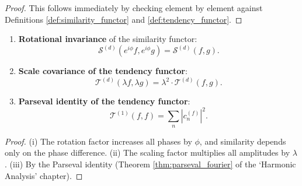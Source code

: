 \begin{proof}
This follows immediately by checking element by element against Definitions \ref{def:similarity_functor} and \ref{def:tendency_functor}.
\end{proof}

\begin{proposition}
\label{prop:similarity_tendency_conservation}
\leavevmode
\begin{enumerate}[label=(\roman*)]
    \item \textbf{Rotational invariance} of the similarity functor:
    \[
    \mathcal{S}^{(d)}(e^{i\phi} f, e^{i\phi} g)
    = \mathcal{S}^{(d)}(f, g).
    \]

    \item \textbf{Scale covariance of the tendency functor}:
    \[
    \mathcal{T}^{(d)}(\lambda f, \lambda g)
    = \lambda^2 \cdot \mathcal{T}^{(d)}(f, g).
    \]

    \item \textbf{Parseval identity of the tendency functor}:
    \[
    \mathcal{T}^{(1)}(f, f) = \sum_n |c_n^{(f)}|^2.
    \]
\end{enumerate}
\end{proposition}

\begin{proof}
(i) The rotation factor increases all phases by $\phi$, and similarity depends only on the phase difference. (ii) The scaling factor multiplies all amplitudes by $\lambda$. (iii) By the Parseval identity (Theorem \ref{thm:parseval_fourier} of the `Harmonic Analysis' chapter).
\end{proof}

